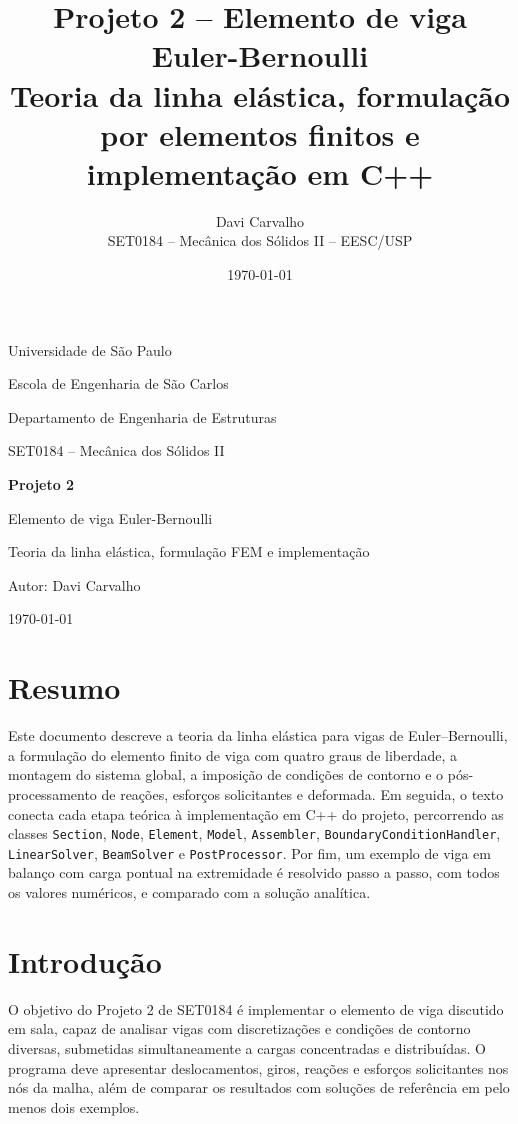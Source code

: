 \documentclass[12pt,a4paper]{article}
\title{\textbf{Projeto 2 -- Elemento de viga Euler-Bernoulli}\\
\large Teoria da linha elástica, formulação por elementos finitos e implementação em C++}
\author{Davi Carvalho\\SET0184 -- Mecânica dos Sólidos II -- EESC/USP}
\date{\today}
\begin{document}
\sloppy

\begin{titlepage}
  \centering
  {\Large Universidade de São Paulo\par}
  {\large Escola de Engenharia de São Carlos\par}
  {\large Departamento de Engenharia de Estruturas\par}
  \vspace{1.5cm}
  {\large SET0184 -- Mecânica dos Sólidos II\par}
  \vspace{2.5cm}
  {\Huge\bfseries Projeto 2\par}
  \vspace{0.5cm}
  {\LARGE Elemento de viga Euler-Bernoulli\par}
  \vspace{0.8cm}
  {\Large Teoria da linha elástica, formulação FEM e implementação\par}
  \vfill
  {\large Autor: Davi Carvalho\par}
  {\large \today\par}
\end{titlepage}

\section*{Resumo}
Este documento descreve a teoria da linha elástica para vigas de Euler--Bernoulli, a formulação do elemento finito de viga com quatro graus de liberdade, a montagem do sistema global, a imposição de condições de contorno e o pós-processamento de reações, esforços solicitantes e deformada. Em seguida, o texto conecta cada etapa teórica à implementação em C++ do projeto, percorrendo as classes \texttt{Section}, \texttt{Node}, \texttt{Element}, \texttt{Model}, \texttt{Assembler}, \texttt{BoundaryConditionHandler}, \texttt{LinearSolver}, \texttt{BeamSolver} e \texttt{PostProcessor}. Por fim, um exemplo de viga em balanço com carga pontual na extremidade é resolvido passo a passo, com todos os valores numéricos, e comparado com a solução analítica.

\tableofcontents
\newpage

\section{Introdução}
\label{sec:introducao}

O objetivo do Projeto 2 de SET0184 é implementar o elemento de viga discutido em sala, capaz de analisar vigas com discretizações e condições de contorno diversas, submetidas simultaneamente a cargas concentradas e distribuídas. O programa deve apresentar deslocamentos, giros, reações e esforços solicitantes nos nós da malha, além de comparar os resultados com soluções de referência em pelo menos dois exemplos.
\end{document}
